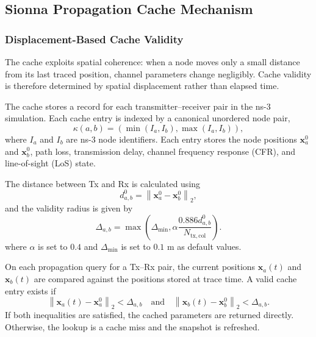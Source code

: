 \subsection{Sionna Propagation Cache Mechanism}
\label{sec:sionna-cache-mechanism}

\subsubsection{Displacement-Based Cache Validity}
\label{subsec:cache-validity}

The cache exploits spatial coherence: when a node moves only a small distance from its last traced position, channel parameters change negligibly.
Cache validity is therefore determined by spatial displacement rather than elapsed time.

The cache stores a record for each transmitter–receiver pair in the ns-3 simulation.
Each cache entry is indexed by a canonical unordered node pair,
\begin{equation}
    \kappa(a,b)=\left(\min(I_a,I_b),\max(I_a,I_b)\right),
\end{equation}
where $I_a$ and $I_b$ are ns-3 node identifiers.
Each entry stores the node positions $\mathbf{x}_a^0$ and $\mathbf{x}_b^0$, path loss, transmission delay, channel frequency response (CFR), and line-of-sight (LoS) state.

The distance between Tx and Rx is calculated using
\begin{equation}
    d_{a,b}^0=\left\|\mathbf{x}_a^0-\mathbf{x}_b^0\right\|_2 ,
\end{equation}
and the validity radius is given by
\begin{equation}
    \Delta_{a,b}=
    \max\left(
    \Delta_{\min},
    \alpha \frac{0.886 d_{a,b}^0}{N_{\mathrm{tx,col}}}
    \right).
\end{equation}
where $\alpha$ is set to $0.4$ and $\Delta_{\min}$ is set to $0.1$ m as default values.

On each propagation query for a Tx–Rx pair, the current positions $\mathbf{x}_a(t)$ and $\mathbf{x}_b(t)$ are compared against the positions stored at trace time.
A valid cache entry exists if
\begin{equation}
    \left\|\mathbf{x}_a(t)-\mathbf{x}_a^0\right\|_2 < \Delta_{a,b}
    \quad\mathrm{and}\quad
    \left\|\mathbf{x}_b(t)-\mathbf{x}_b^0\right\|_2 < \Delta_{a,b}.
\end{equation}
If both inequalities are satisfied, the cached parameters are returned directly.
Otherwise, the lookup is a cache miss and the snapshot is refreshed.

